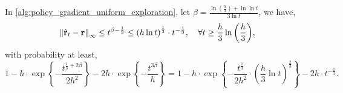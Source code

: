 \begin{thm}
\label{thm:reward_estimation_hoeffding}
    In \cref{alg:policy_gradient_uniform_exploration}, let $\beta = \frac{ \ln{\left(\frac{h}{3}\right) + \ln{\ln{t}} } }{ 3 \ln{t}}$, we have,
\begin{equation*}
    \left\| \hat{{\mathbf{r}}}_t - {\mathbf{r}} \right\|_\infty \le t^{\beta - \frac{1}{3}} \le \left( h \ln{t} \right) ^\frac{1}{3} \cdot t^{- \frac{1}{3}}, \quad \forall t \ge \frac{h}{3} \ln{\left(\frac{h}{3}\right) },
\end{equation*}
with probability at least,
\begin{equation*}
    1 - h \cdot \exp\left\{ -  \frac{t^{\frac{1}{3} + 2 \beta}}{2 h^2} \right\} - 2 h \cdot \exp\left\{ - \frac{t^{3\beta}}{ h } \right\} = 1 - h \cdot \exp\left\{ - \frac{t^{\frac{1}{3}}}{2 h^2} \cdot \left( \frac{h}{3} \ln{t} \right)^{\frac{2}{3}} \right\} - 2 h \cdot t^{- \frac{1}{3}}.
\end{equation*}
\end{thm}
